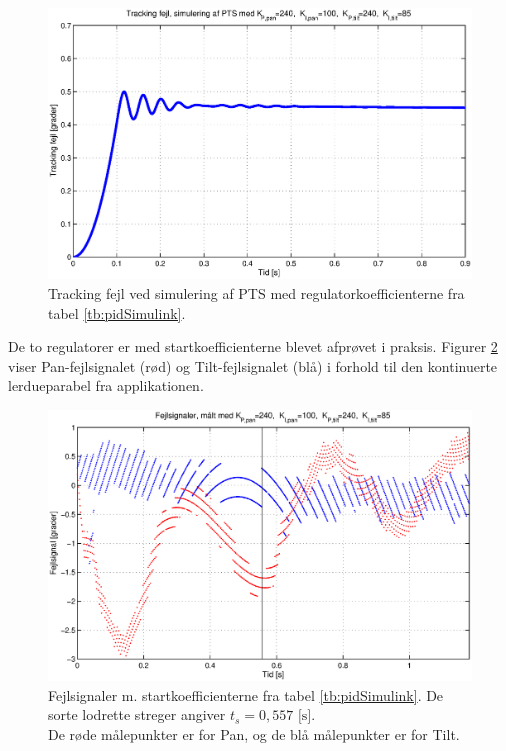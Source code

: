 \begin{figure}[h!]
\centering
\includegraphics[width=1\textwidth]{./graphics/pidSim1.eps}
\caption[Tracking fejl ved simulering]{Tracking fejl ved simulering af PTS med regulatorkoefficienterne fra tabel \ref{tb:pidSimulink}.} 
\label{fig:pidSim1}
\end{figure}

De to regulatorer er med startkoefficienterne blevet afprøvet i praksis.
Figurer \ref{fig:pidPhys1} viser Pan-fejlsignalet (rød) og Tilt-fejlsignalet (blå)
i forhold til den kontinuerte lerdueparabel fra applikationen.

\begin{figure}[h!]
\centering
\includegraphics[width=1\textwidth]{./graphics/pidPhys1.eps}
\caption[Fejlsignaler m. startkoefficienter]{Fejlsignaler m. startkoefficienterne fra tabel \ref{tb:pidSimulink}.
	De sorte lodrette streger angiver \(t_s=0,557 \text{ [s]}\).\\
	De røde målepunkter er for Pan, og de blå målepunkter er for Tilt.} 
\label{fig:pidPhys1}
\end{figure}

